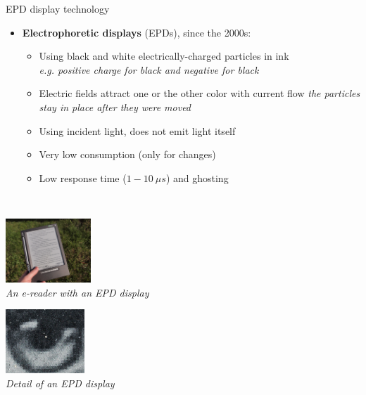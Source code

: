 \begin{frame}{EPD display technology}
  \begin{itemize}
  \item \textbf{Electrophoretic displays} (EPDs), since the 2000s:
    \begin{itemize}
    \item Using black and white electrically-charged particles in ink\\
    \textit{e.g. positive charge for black and negative for black}
    \item Electric fields attract one or the other color with current flow
    \textit{the particles stay in place after they were moved}
    \item Using incident light, does not emit light itself
    \item Very low consumption (only for changes)
    \item Low response time (\(1-10~\mu s\)) and ghosting
    \end{itemize}
  \end{itemize}~

  \begin{minipage}[b]{0.45\textwidth}
    \centering
    \includegraphics[height=6.5em]{slides/graphics-hardware/e-reader.jpg}\\
    \textit{\small An e-reader with an EPD display}
  \end{minipage}
  \hfill
  \begin{minipage}[b]{0.45\textwidth}
    \centering
    \includegraphics[height=6.5em]{slides/graphics-hardware/epd-detail.jpg}\\
    \textit{\small Detail of an EPD display}
  \end{minipage}
\end{frame}

